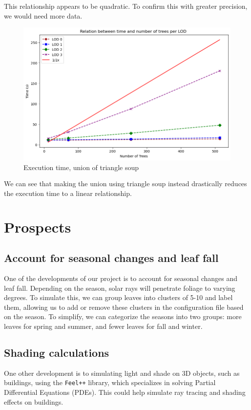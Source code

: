 \documentclass[12pt]{article}
\begin{document}
This relationship appears to be quadratic. To confirm this with
greater precision, we would need more data.

\begin{figure}[H]
    \centering
    \includegraphics[width=1\textwidth]{images/bench-time-ntree-linear.png}
    \caption{Execution time, union of triangle soup}
\end{figure}

We can see that making the union using triangle soup instead drastically reduces the
execution time to a linear relationship.

\newpage

\section{Prospects}

\subsection{Account for seasonal changes and leaf fall}
One of the developments of our project is to account for seasonal changes and
leaf fall. Depending on the season, solar rays will penetrate foliage to
varying degrees. To simulate this, we can group leaves into clusters of 5-10
and label them, allowing us to add or remove these clusters in the
configuration file based on the season. To simplify, we can categorize the
seasons into two groups: more leaves for spring and summer, and fewer leaves
for fall and winter.

\subsection{Shading calculations}
One other development is to simulating light and shade on 3D objects, such as
buildings, using the \texttt{Feel++}\cite{feel++} library, which specializes in
solving Partial Differential Equations (PDEs). This could help simulate ray
tracing and shading effects on buildings.
\end{document}
